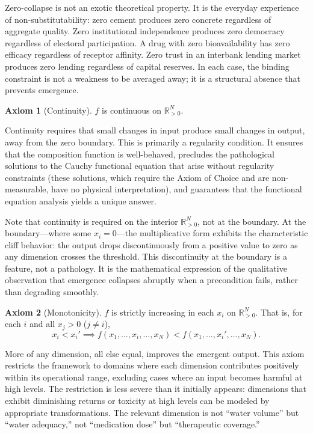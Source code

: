 \documentclass[12pt, a4paper]{article}
\theoremstyle{definition}
\newtheorem{axiom}{Axiom}
\theoremstyle{remark}
\newcommand{\Rp}{\mathbb{R}_{>0}}
\begin{document}
Zero-collapse is not an exotic theoretical property. It is the everyday experience of non-substitutability: zero cement produces zero concrete regardless of aggregate quality. Zero institutional independence produces zero democracy regardless of electoral participation. A drug with zero bioavailability has zero efficacy regardless of receptor affinity. Zero trust in an interbank lending market produces zero lending regardless of capital reserves. In each case, the binding constraint is not a weakness to be averaged away; it is a structural absence that prevents emergence.

\begin{axiom}[Continuity]\label{ax:cont}
$f$ is continuous on $\Rp^N$.
\end{axiom}

\noindent Continuity requires that small changes in input produce small changes in output, away from the zero boundary. This is primarily a regularity condition. It ensures that the composition function is well-behaved, precludes the pathological solutions to the Cauchy functional equation that arise without regularity constraints (these solutions, which require the Axiom of Choice and are non-measurable, have no physical interpretation), and guarantees that the functional equation analysis yields a unique answer.

Note that continuity is required on the interior $\Rp^N$, not at the boundary. At the boundary---where some $x_i = 0$---the multiplicative form exhibits the characteristic cliff behavior: the output drops discontinuously from a positive value to zero as any dimension crosses the threshold. This discontinuity at the boundary is a feature, not a pathology. It is the mathematical expression of the qualitative observation that emergence collapses abruptly when a precondition fails, rather than degrading smoothly.

\begin{axiom}[Monotonicity]\label{ax:mono}
$f$ is strictly increasing in each $x_i$ on $\Rp^N$. That is, for each $i$ and all $x_j > 0$ ($j \neq i$),
\[
x_i < x_i' \implies f(x_1, \ldots, x_i, \ldots, x_N) < f(x_1, \ldots, x_i', \ldots, x_N).
\]
\end{axiom}

\noindent More of any dimension, all else equal, improves the emergent output. This axiom restricts the framework to domains where each dimension contributes positively within its operational range, excluding cases where an input becomes harmful at high levels. The restriction is less severe than it initially appears: dimensions that exhibit diminishing returns or toxicity at high levels can be modeled by appropriate transformations. The relevant dimension is not ``water volume'' but ``water adequacy,'' not ``medication dose'' but ``therapeutic coverage.''
\end{document}
